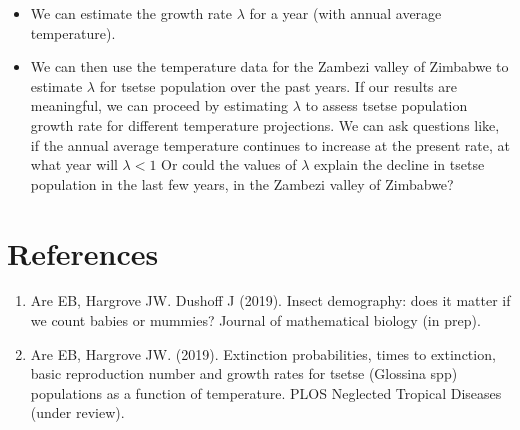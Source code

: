 \documentclass[10pt,a4paper]{article}
\begin{document}
\begin{itemize}  
\item  We can estimate the growth rate $\lambda$ for a year (with annual average temperature). 

\item We can then use the temperature data for the Zambezi valley of Zimbabwe to estimate $\lambda$ for tsetse population over the past years. If our results are meaningful, we can proceed by estimating  $\lambda$ to assess tsetse population growth rate for different temperature projections. We can ask questions like, if the annual average   temperature continues to increase at the present rate, at what year will $\lambda < 1$ Or could the values of $\lambda$ explain the decline in tsetse population in the last few years, in the Zambezi valley of Zimbabwe? 
\end{itemize}


\section*{References}
\begin{enumerate} 
\item 	Are EB, Hargrove JW. Dushoff J (2019). Insect demography: does it matter if we count babies or mummies? Journal of mathematical biology (in prep).

\item 	Are EB, Hargrove JW. (2019). Extinction probabilities, times to extinction, basic reproduction number and growth rates for tsetse (Glossina spp) populations as a function of temperature. PLOS Neglected Tropical Diseases  (under review).


\end{enumerate}
\end{document}
